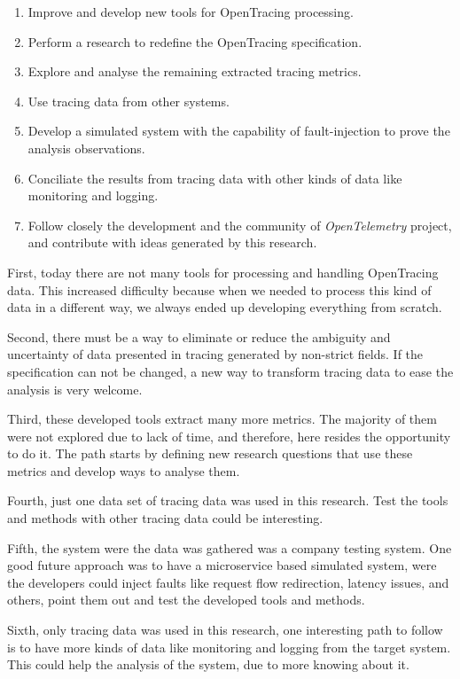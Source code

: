 \begin{enumerate}
    \item Improve and develop new tools for OpenTracing processing.
    \item Perform a research to redefine the OpenTracing specification. 
    \item Explore and analyse the remaining extracted tracing metrics.
    \item Use tracing data from other systems.
    \item Develop a simulated system with the capability of fault-injection to prove the analysis observations.
    \item Conciliate the results from tracing data with other kinds of data like monitoring and logging.
    \item Follow closely the development and the community of \emph{OpenTelemetry} project, and contribute with ideas generated by this research.
\end{enumerate}

First, today there are not many tools for processing and handling OpenTracing data. This increased difficulty because when we needed to process this kind of data in a different way, we always ended up developing everything from scratch.

Second, there must be a way to eliminate or reduce the ambiguity and uncertainty of data presented in tracing generated by non-strict fields. If the specification can not be changed, a new way to transform tracing data to ease the analysis is very welcome.

Third, these developed tools extract many more metrics. The majority of them were not explored due to lack of time, and therefore, here resides the opportunity to do it. The path starts by defining new research questions that use these metrics and develop ways to analyse them.

Fourth, just one data set of tracing data was used in this research. Test the tools and methods with other tracing data could be interesting.

Fifth, the system were the data was gathered was a company testing system. One good future approach was to have a microservice based simulated system, were the developers could inject faults like request flow redirection, latency issues, and others, point them out and test the developed tools and methods.

Sixth, only tracing data was used in this research, one interesting path to follow is to have more kinds of data like monitoring and logging from the target system. This could help the analysis of the system, due to more knowing about it.

